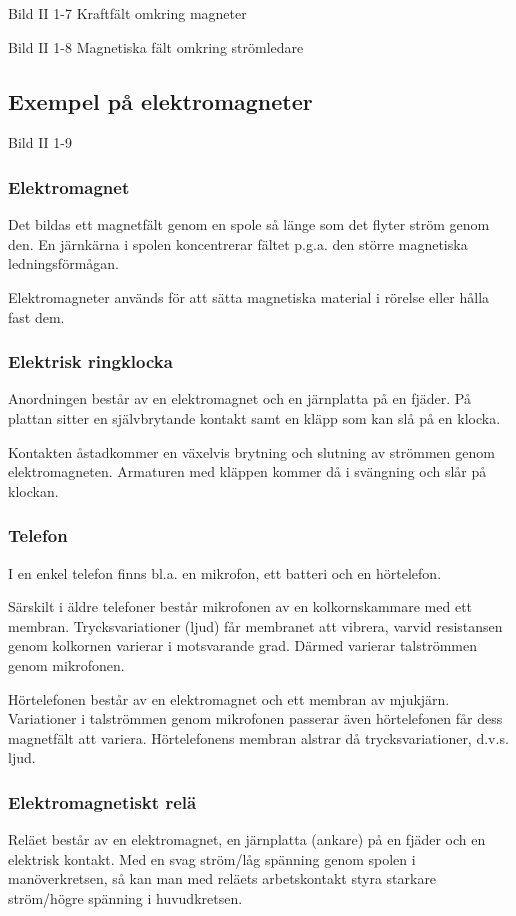 \documentclass[a4paper,twoside,twocolumn,openright]{book}
\begin{document}
Bild II 1-7 Kraftfält omkring magneter

Bild II 1-8 Magnetiska fält omkring strömledare

\subsection{Exempel på elektromagneter}

Bild II 1-9

\subsubsection{Elektromagnet}
Det bildas ett magnetfält genom en spole så länge som det flyter ström genom den. En
järnkärna i spolen koncentrerar fältet p.g.a. den större magnetiska ledningsförmågan.

Elektromagneter används för att sätta magnetiska material i rörelse eller hålla fast
dem.

\subsubsection{Elektrisk ringklocka}
Anordningen består av en elektromagnet och en järnplatta på en fjäder. På plattan
sitter en självbrytande kontakt samt en kläpp som kan slå på en klocka.

Kontakten åstadkommer en växelvis brytning och slutning av strömmen genom
elektromagneten. Armaturen med kläppen kommer då i svängning och slår på klockan.

\subsubsection{Telefon}
I en enkel telefon finns bl.a. en mikrofon, ett batteri och en hörtelefon.

Särskilt i äldre telefoner består mikrofonen av en kolkornskammare med ett membran.
Trycksvariationer (ljud) får membranet att vibrera, varvid resistansen genom kolkornen
varierar i motsvarande grad. Därmed varierar talströmmen genom mikrofonen.

Hörtelefonen består av en elektromagnet och ett membran av mjukjärn. Variationer i
talströmmen genom mikrofonen passerar även hörtelefonen får dess magnetfält att variera.
Hörtelefonens membran alstrar då trycksvariationer, d.v.s. ljud.

\subsubsection{Elektromagnetiskt relä}
Reläet består av en elektromagnet, en järnplatta (ankare) på en fjäder och en elektrisk
kontakt. Med en svag ström/låg spänning genom spolen i manöverkretsen, så kan
man med reläets arbetskontakt styra starkare ström/högre spänning i huvudkretsen.
\end{document}
